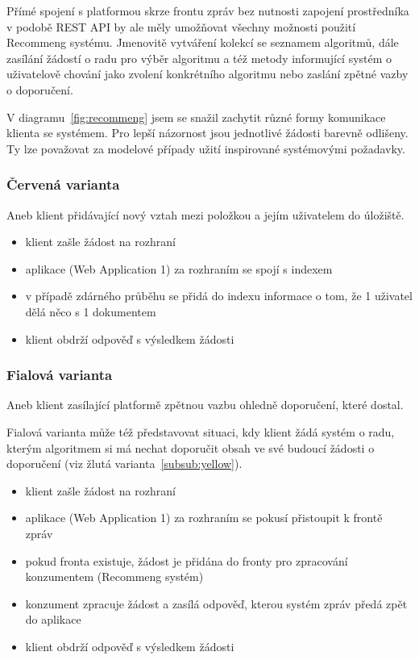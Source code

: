 \documentclass[thesis=M,czech]{FITthesis}[2014/05/07]
\begin{document}
Přímé spojení s platformou skrze frontu zpráv bez nutnosti zapojení prostředníka v podobě REST API by ale měly umožňovat všechny možnosti použití Recommeng systému. Jmenovitě vytváření kolekcí se seznamem algoritmů, dále zasílání žádostí o radu pro výběr algoritmu a též metody informující systém o uživatelově chování jako zvolení konkrétního algoritmu nebo zaslání zpětné vazby o doporučení. 

V diagramu~\ref{fig:recommeng} jsem se snažil zachytit různé formy komunikace klienta se systémem. Pro lepší názornost jsou jednotlivé žádosti barevně odlišeny. Ty lze považovat za modelové případy užití inspirované systémovými požadavky.

\subsubsection{Červená varianta}

Aneb klient přidávající nový vztah mezi položkou a jejím uživatelem do úložiště.

\begin{itemize}
	\item klient zašle žádost na rozhraní
	\item aplikace (Web Application 1) za rozhraním se spojí s indexem
	\item v případě zdárného průběhu se přidá do indexu informace o tom, že 1 uživatel dělá něco s 1 dokumentem
	\item klient obdrží odpověď s výsledkem žádosti
\end{itemize}

\subsubsection{Fialová varianta}
\label{subsub:purple}

Aneb klient zasílající platformě zpětnou vazbu ohledně doporučení, které dostal.

Fialová varianta může též představovat situaci, kdy klient žádá systém o radu, kterým algoritmem si má nechat doporučit obsah ve své budoucí žádosti o doporučení (viz žlutá varianta~\ref{subsub:yellow}).

\begin{itemize}
	\item klient zašle žádost na rozhraní
	\item aplikace (Web Application 1) za rozhraním se pokusí přistoupit k frontě zpráv
	\item pokud fronta existuje, žádost je přidána do fronty pro zpracování konzumentem (Recommeng systém)
	\item konzument zpracuje žádost a zasílá odpověď, kterou systém zpráv předá zpět do aplikace
	\item klient obdrží odpověď s výsledkem žádosti
\end{itemize}
\end{document}
